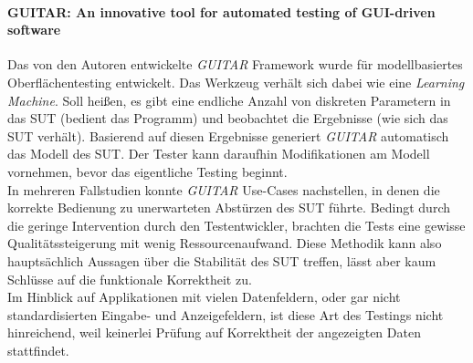 \paragraph{GUITAR: An innovative tool for automated testing of GUI-driven software \cite{nguyen_guitar:_2014}}Das von den Autoren entwickelte \textit{GUITAR} Framework wurde für modellbasiertes Oberflächentesting entwickelt. Das Werkzeug verhält sich dabei wie eine \textit{Learning Machine}. Soll heißen, es gibt eine endliche Anzahl von diskreten Parametern in das SUT (bedient das Programm) und beobachtet die Ergebnisse (wie sich das SUT verhält). Basierend auf diesen Ergebnisse generiert \textit{GUITAR} automatisch das Modell des SUT. Der Tester kann daraufhin Modifikationen am Modell vornehmen, bevor das eigentliche Testing beginnt.\\ 
In mehreren Fallstudien konnte \textit{GUITAR} Use-Cases nachstellen, in denen die korrekte Bedienung zu unerwarteten Abstürzen des SUT führte. Bedingt durch die geringe Intervention durch den Testentwickler, brachten die Tests eine gewisse Qualitätssteigerung mit wenig Ressourcenaufwand. Diese Methodik kann also hauptsächlich Aussagen über die Stabilität des SUT treffen, lässt aber kaum Schlüsse auf die funktionale Korrektheit zu.\\
Im Hinblick auf Applikationen mit vielen Datenfeldern, oder gar nicht standardisierten Eingabe- und Anzeigefeldern, ist diese Art des Testings nicht hinreichend, weil keinerlei Prüfung auf Korrektheit der angezeigten Daten stattfindet.


